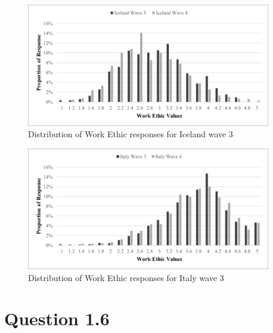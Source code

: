 \documentclass[11pt,a4paper]{article}
\begin{document}
\begin{figure}[H]
  \begin{center}
    \includegraphics[width=0.95\textwidth]{figures/IcelandQ1_5}
  \end{center}
  \caption{Distribution of Work Ethic responses for Iceland wave 3}
  \label{fig:}
\end{figure}

\begin{figure}[H]
  \begin{center}
    \includegraphics[width=0.95\textwidth]{figures/ItalyQ1_5}
  \end{center}
  \caption{Distribution of Work Ethic responses for Italy wave 3}
  \label{fig:}
\end{figure}



\newpage
\section*{Question 1.6}



\newpage


\end{document}
